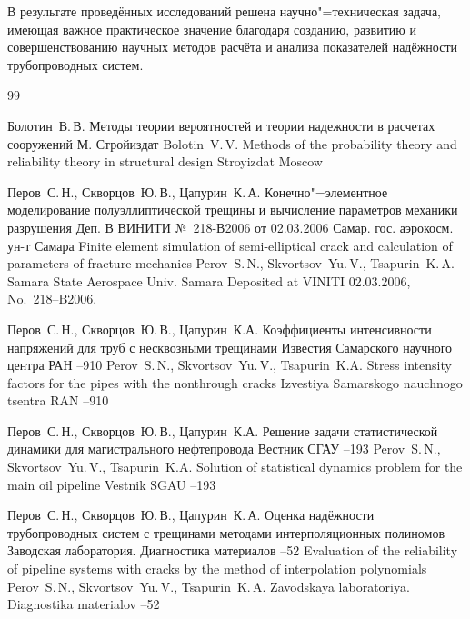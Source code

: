 В результате проведённых исследований решена научно"=техническая задача, имеющая важное практическое
значение благодаря созданию, развитию и совершенствованию научных методов расчёта и анализа показателей надёжности трубопроводных систем.


\begin{thebibliography}{99}

\by Болотин~В.\,В.
\book Методы теории
вероятностей и теории надежности в расчетах сооружений
\publaddr М.
\publ Стройиздат
\misctransl
\by Bolotin~V.\,V.
\book Methods of the probability theory and reliability theory in structural design 
\publ Stroyizdat
\publaddr Moscow


\by Перов~С.\,Н., Скворцов~Ю.\,В., Цапурин~К.\,А.
\book Конечно"=элементное моделирование полуэллиптической трещины и вычисление параметров механики разрушения
\miscnote Деп. В ВИНИТИ №~218-В2006 от 02.03.2006
\publ Самар. гос. аэрокосм. ун-т
\publaddr Самара
\misctransl
\book Finite element simulation of semi-elliptical crack and calculation of parameters of fracture mechanics
\by Perov~S.\,N., Skvortsov~Yu.\,V., Tsapurin~K.\,A.
\publ Samara State Aerospace Univ.
\publaddr Samara
\miscnote Deposited at VINITI 02.03.2006, No.~218--B2006.


\by Перов~С.\,Н., Скворцов~Ю.\,В., Цапурин~К.А.
\paper Коэффициенты интенсивности напряжений для труб с несквозными трещинами
\jour Известия Самарского научного центра РАН
--910
\misctransl
\by Perov~S.\,N., Skvortsov~Yu.\,V., Tsapurin~K.A.
\paper Stress intensity factors for the pipes with the nonthrough cracks
\jour Izvestiya Samarskogo nauchnogo tsentra RAN
--910

\by Перов~С.\,Н., Скворцов~Ю.\,В., Цапурин~К.А.
\paper Решение задачи статистической динамики для магистрального нефтепровода
\jour Вестник СГАУ
--193
\misctransl
\by Perov~S.\,N., Skvortsov~Yu.\,V., Tsapurin~K.A.
\paper Solution of statistical dynamics  problem for the main oil pipeline
\jour Vestnik SGAU
--193

\by Перов~С.\,Н., Скворцов~Ю.\,В., Цапурин~К.\,А.
\paper Оценка надёжности трубопроводных систем с трещинами методами интерполяционных полиномов
\jour Заводская лаборатория. Диагностика материалов
--52
\misctransl
\paper Evaluation of the reliability of pipeline systems with cracks by the method of interpolation polynomials
\by Perov~S.\,N., Skvortsov~Yu.\,V., Tsapurin~K.\,A. 
\jour Zavodskaya laboratoriya. Diagnostika materialov 
--52


\end{thebibliography}
